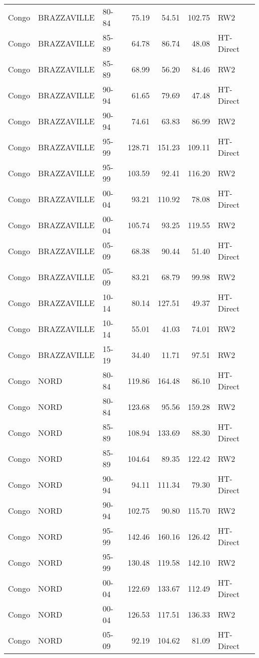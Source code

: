 \begin{longtable}{lllrrrl}
  Congo & BRAZZAVILLE & 80-84 & 75.19 & 54.51 & 102.75 & RW2 \\ 
  Congo & BRAZZAVILLE & 85-89 & 64.78 & 86.74 & 48.08 & HT-Direct \\ 
  Congo & BRAZZAVILLE & 85-89 & 68.99 & 56.20 & 84.46 & RW2 \\ 
  Congo & BRAZZAVILLE & 90-94 & 61.65 & 79.69 & 47.48 & HT-Direct \\ 
  Congo & BRAZZAVILLE & 90-94 & 74.61 & 63.83 & 86.99 & RW2 \\ 
  Congo & BRAZZAVILLE & 95-99 & 128.71 & 151.23 & 109.11 & HT-Direct \\ 
  Congo & BRAZZAVILLE & 95-99 & 103.59 & 92.41 & 116.20 & RW2 \\ 
  Congo & BRAZZAVILLE & 00-04 & 93.21 & 110.92 & 78.08 & HT-Direct \\ 
  Congo & BRAZZAVILLE & 00-04 & 105.74 & 93.25 & 119.55 & RW2 \\ 
  Congo & BRAZZAVILLE & 05-09 & 68.38 & 90.44 & 51.40 & HT-Direct \\ 
  Congo & BRAZZAVILLE & 05-09 & 83.21 & 68.79 & 99.98 & RW2 \\ 
  Congo & BRAZZAVILLE & 10-14 & 80.14 & 127.51 & 49.37 & HT-Direct \\ 
  Congo & BRAZZAVILLE & 10-14 & 55.01 & 41.03 & 74.01 & RW2 \\ 
  Congo & BRAZZAVILLE & 15-19 & 34.40 & 11.71 & 97.51 & RW2 \\ 
  Congo & NORD & 80-84 & 119.86 & 164.48 & 86.10 & HT-Direct \\ 
  Congo & NORD & 80-84 & 123.68 & 95.56 & 159.28 & RW2 \\ 
  Congo & NORD & 85-89 & 108.94 & 133.69 & 88.30 & HT-Direct \\ 
  Congo & NORD & 85-89 & 104.64 & 89.35 & 122.42 & RW2 \\ 
  Congo & NORD & 90-94 & 94.11 & 111.34 & 79.30 & HT-Direct \\ 
  Congo & NORD & 90-94 & 102.75 & 90.80 & 115.70 & RW2 \\ 
  Congo & NORD & 95-99 & 142.46 & 160.16 & 126.42 & HT-Direct \\ 
  Congo & NORD & 95-99 & 130.48 & 119.58 & 142.10 & RW2 \\ 
  Congo & NORD & 00-04 & 122.69 & 133.67 & 112.49 & HT-Direct \\ 
  Congo & NORD & 00-04 & 126.53 & 117.51 & 136.33 & RW2 \\ 
  Congo & NORD & 05-09 & 92.19 & 104.62 & 81.09 & HT-Direct \\ 

\end{longtable}
